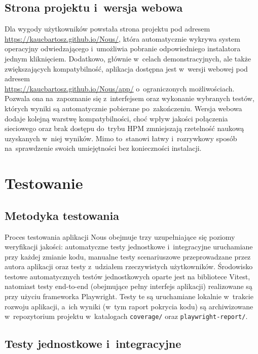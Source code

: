 \documentclass[12pt, a4paper, oneside]{report}
\begin{document}
\subsection{Strona projektu i~wersja webowa}
\label{subsec:web}

Dla wygody użytkowników powstała strona projektu pod adresem \\
\url{https://kaucbartosz.github.io/Nous/}, która automatycznie wykrywa system
operacyjny odwiedzającego i~umożliwia pobranie odpowiedniego instalatora
jednym kliknięciem. Dodatkowo, głównie w~celach demonstracyjnych, ale także
zwi\k{e}kszających kompatybilność, aplikacja dostępna jest w~wersji webowej
pod adresem\\  \url{https://kaucbartosz.github.io/Nous/app/} o~ograniczonych
możliwościach. Pozwala ona na~zapoznanie się z~interfejsem oraz wykonanie
wybranych testów, których wyniki są automatycznie pobierane po~zakończeniu.
Wersja webowa dodaje kolejną warstwę kompatybilności, choć wpływ jakości
połączenia sieciowego oraz brak dostępu do~trybu HPM zmniejszają rzetelność
naukową uzyskanych w~niej wyników. Mimo to~stanowi łatwy i~rozrywkowy sposób
na~sprawdzenie swoich umiejętności bez konieczności instalacji.


\section{Testowanie}
\label{sec:testowanie}

\subsection{Metodyka testowania}
\label{subsec:metodyka}

Proces testowania aplikacji Nous obejmuje trzy uzupełniające się poziomy weryfikacji jakości: automatyczne testy jednostkowe i~integracyjne uruchamiane przy każdej zmianie kodu, manualne testy scenariuszowe przeprowadzane przez autora aplikacji oraz testy z~udziałem rzeczywistych użytkowników. Środowisko testowe automatycznych testów jednostkowych oparte jest na bibliotece Vitest, natomiast testy end-to-end (obejmujące pełny interfejs aplikacji) realizowane są przy użyciu frameworka Playwright. Testy te są uruchamiane lokalnie w~trakcie rozwoju aplikacji, a~ich wyniki (w~tym raport pokrycia kodu) są archiwizowane w~repozytorium projektu w~katalogach \texttt{coverage/} oraz \texttt{playwright-report/}.

\subsection{Testy jednostkowe i~integracyjne}
\label{subsec:testy-auto}
\end{document}
